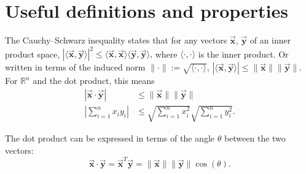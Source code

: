 \documentclass[9pt, headings=standardclasses, parskip=half]{scrartcl}
\renewcommand{\emph}[1]{\textcolor{mypurple}{#1}}
\newcommand{\vect}[1]{\vec{\boldsymbol{#1}}}
\begin{document}
\section{Useful definitions and properties}

\tikzexternaldisable
\begin{theorem}
  The \emph{Cauchy--Schwarz inequality} states that for any vectors \(\vect{x}\), \(\vect{y}\) of an inner product space,
  \(
  |\langle \vect{x}, \vect{y} \rangle|^{2} \leq \langle \vect{x}, \vect{x} \rangle \langle \vect{y}, \vect{y} \rangle
  \text{,}
  \)
  where \(\langle \cdot, \cdot \rangle\) is the inner product. Or written in terms of the induced norm \(\|\cdot\|:=\sqrt{\langle \cdot, \cdot \rangle}\),
  \(
  |\langle \vect{x}, \vect{y} \rangle| \leq \|\vect{x}\| \|\vect{y}\|
  \text{.}
  \)
  For \(\mathbb{R}^{n}\) and the dot product, this means
  \[
  \begin{aligned}
  |\vect{x} \cdot \vect{y}| &\leq \|\vect{x}\| \|\vect{y}\| \\
  \left|\sum_{i=1}^{n} x_{i}y_{i}\right| &\leq \sqrt{\sum_{i=1}^{n} x_{i}^{2}} \sqrt{\sum_{i=1}^{n} y_{i}^{2}} \text{.} 
  \end{aligned}
  \]
\end{theorem}
The dot product can be expressed in terms of the angle \(\theta\) between the two vectors:
\[
\vect{x} \cdot \vect{y} = \vect{x}^{T}\vect{y} = \|\vect{x}\| \|\vect{y}\| \cos(\theta) \text{.}
\]
\end{document}
